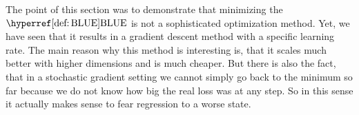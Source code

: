 The point of this section was to demonstrate that minimizing the
\(\BLUE\) is not a sophisticated optimization method. Yet, we have seen that it
results in a gradient descent method with a specific learning rate. The main
reason why this method is interesting is, that it scales much better with higher
dimensions and is much cheaper. But there is also the fact, that in a stochastic
gradient setting we cannot simply go back to the minimum so far because we do
not know how big the real loss was at any step. So in this sense it actually
makes sense to fear regression to a worse state.